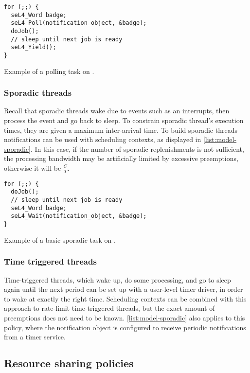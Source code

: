 \begin{listing}
  \begin{verbatim}
for (;;) {
  seL4_Word badge;
  seL4_Poll(notification_object, &badge);
  doJob();
  // sleep until next job is ready
  seL4_Yield();
}
  \end{verbatim}
  \caption{Example of a polling task on \selfour.}
  \label{list:polling}
\end{listing}

\subsubsection{Sporadic threads}

Recall that sporadic threads wake due to events such as an interrupts, then process the event and
go back to sleep. To constrain sporadic thread's execution times, they are given a maximum
inter-arrival time.
To build sporadic threads notifications can be used
with scheduling contexts, as displayed in \cref{list:model-sporadic}. In this case, if the
number of sporadic replenishments is not sufficient, the processing bandwidth may be artificially
limited by excessive preemptions, otherwise it will be $\frac{C}{T}$. 

\begin{listing}
  \begin{verbatim}
for (;;) {
  doJob();
  // sleep until next job is ready
  seL4_Word badge;
  seL4_Wait(notification_object, &badge);
}
  \end{verbatim}
  \caption{Example of a basic sporadic task on \selfour.}
  \label{list:model-sporadic}
\end{listing}

\subsubsection{Time triggered threads}

Time-triggered threads, which wake up, do some processing, and go to sleep again until the next
period can be set up with a user-level timer driver, in order to wake at exactly the right time.
Scheduling contexts can be combined with this approach to rate-limit time-triggered threads, but 
the exact amount of preemptions does not need to be known.
\cref{list:model-sporadic} also applies to this policy, where the notification object is configured to
receive periodic notifications from a timer service.

\subsection{Resource sharing policies}


